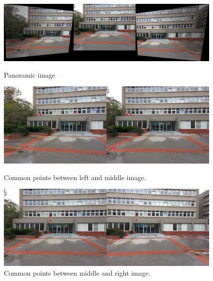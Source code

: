 \documentclass[letterpaper,12pt]{article}
\begin{document}
\begin{figure}[!htb]
        \centering\includegraphics[width=1\columnwidth]{experiments/5points/finalNonewrong.jpg}
          \caption{
                \label{} Panoramic image
        }
        \centering\includegraphics[width=1\columnwidth]{experiments/5points/left-1_middleNonewrong.jpg}
          \caption{
                \label{} Common points between left and middle image.
        }
        \centering\includegraphics[width=1\columnwidth]{experiments/5points/middle_left-1Nonewrong.jpg}
        \caption{
                \label{} Common points between middle and right image.
        }
\end{figure}
\FloatBarrier
\newpage
\end{document}
